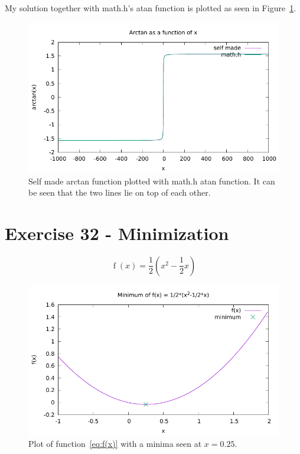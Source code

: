 \documentclass[a4paper,10pt,onecolumn]{article}
\begin{document}
My solution together with math.h's atan function is plotted as seen in Figure~\ref{fig:arctan}.



\begin{figure}[!htbp]
	\centering
	\includegraphics{plotArctan.pdf}
	\caption{Self made arctan function plotted with math.h atan function. It can be seen that the two lines lie on top of each other.}
	\label{fig:arctan}
\end{figure}





\section{Exercise 32 - Minimization}

\begin{equation} \label{eq:f(x)}
	\operatorname{f}(x) = \frac{1}{2} ( x^2 - \frac{1}{2} x )
\end{equation}

\begin{figure}[!htbp]
	\centering
	\includegraphics{plotMin.pdf}
	\caption{Plot of function~\eqref{eq:f(x)} with a minima seen at $x = 0.25$.}
	\label{fig:min}
\end{figure}
\end{document}
